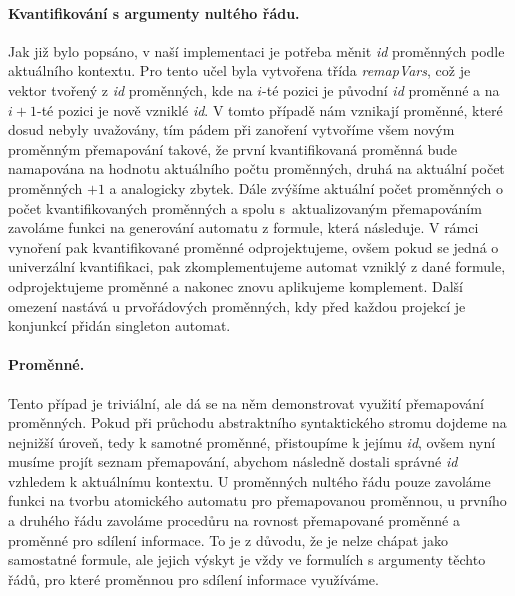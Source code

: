 \paragraph{Kvantifikování s argumenty nultého řádu.} Jak již bylo popsáno, v naší implementaci je potřeba měnit \textit{id} proměnných podle aktuálního kontextu. Pro tento učel byla vytvořena třída \textit{remapVars}, což je vektor tvořený z \textit{id} proměnných, kde na $i$-té pozici je původní \textit{id} proměnné a na $i+1$-té pozici je nově vzniklé \textit{id}. V tomto případě nám vznikají proměnné, které dosud nebyly uvažovány, tím pádem při zanoření vytvoříme všem novým proměnným přemapování takové, že první kvantifikovaná proměnná bude namapována na hodnotu aktuálního počtu proměnných, druhá na aktuální počet proměnných $+1$ a analogicky zbytek. Dále zvýšíme aktuální počet proměnných o počet kvantifikovaných proměnných a spolu s~aktualizovaným přemapováním zavoláme funkci na generování automatu z formule, která následuje. V rámci vynoření pak kvantifikované proměnné odprojektujeme, ovšem pokud se jedná o univerzální kvantifikaci, pak zkomplementujeme automat vzniklý z dané formule, odprojektujeme proměnné a nakonec znovu aplikujeme komplement. Další omezení nastává u prvořádových proměnných, kdy před každou projekcí je konjunkcí přidán singleton automat. 

\paragraph{Proměnné.} Tento případ je triviální, ale dá se na něm demonstrovat využití přemapování proměnných. Pokud při průchodu abstraktního syntaktického stromu dojdeme na nejnižší úroveň, tedy k samotné proměnné, přistoupíme k jejímu \textit{id}, ovšem nyní musíme projít seznam přemapování, abychom následně dostali správné \textit{id} vzhledem k aktuálnímu kontextu. U proměnných nultého řádu pouze zavoláme funkci na tvorbu atomického automatu pro přemapovanou proměnnou, u prvního a druhého řádu zavoláme procedůru na rovnost přemapované proměnné a proměnné pro sdílení informace. To je z důvodu, že je nelze chápat jako samostatné formule, ale jejich výskyt je vždy ve formulích s argumenty těchto řádů, pro které proměnnou pro sdílení informace využíváme.

